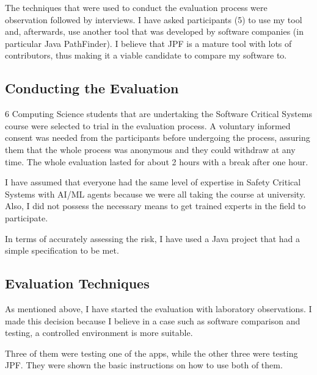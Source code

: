 \documentclass[paper=a4, fontsize=11pt]{scrartcl} %
\numberwithin{equation}{section} %
\numberwithin{figure}{section} %
\numberwithin{table}{section} %
\begin{document}

The techniques that were used to conduct the evaluation process were observation followed by interviews. I have asked participants (5) to use my tool and, afterwards, use another tool that was developed by software companies (in particular Java PathFinder). I believe that JPF is a mature tool with lots of contributors, thus making it a viable candidate to compare my software to.

\subsection{Conducting the Evaluation}

\par
6 Computing Science students that are undertaking the Software Critical Systems course were selected to trial in the evaluation process. A voluntary informed consent was needed from the participants before undergoing the process, assuring them that the whole process was anonymous and they could withdraw at any time. The whole evaluation lasted for about 2 hours with a break after one hour.\\

\par
I have assumed that everyone had the same level of expertise in Safety Critical Systems with AI/ML agents because we were all taking the course at university. Also, I did not possess the necessary means to get trained experts in the field to participate. \\

\par
In terms of accurately assessing the risk, I have used a Java project that had a simple specification to be met. 


\subsection{Evaluation Techniques}

\par
As mentioned above, I have started the evaluation with laboratory observations. I made this decision because I believe in a case such as software comparison and testing, a controlled environment is more suitable. \\

\par
Three of them were testing one of the apps, while the other three were testing JPF. They were shown the basic
instructions on how to use both of them. \\
\end{document}
